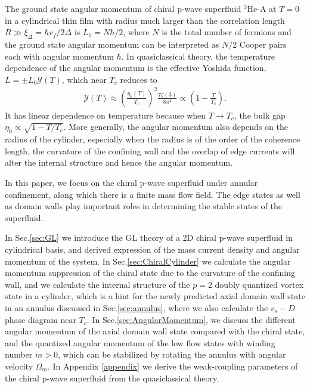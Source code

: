 \documentclass[aps,prb,reprint,groupedaddress]{revtex4-2}
\begin{document}
The ground state angular momentum of chiral p-wave superfluid $^3$He-A at $T=0$
in a cylindrical thin film with radius much larger than the correlation length
$R\gg\xi_\Delta=\hbar v_f/2\Delta$ is $L_0=N\hbar/2$, where $N$ is the total
number of fermions and the ground state angular momentum can be interpreted as
$N/2$ Cooper pairs each with angular momentum $\hbar$\cite{mcclure79}. In
quasiclassical theory, the temperature dependence of the angular momentum is
the effective Yoshida function, $L=\pm L_0\mathcal{Y}(T)$\cite{Sauls11},
which near $T_c$ reduces to
\begin{align}
    \mathcal{Y}(T)\approx\left(\frac{\eta_0(T)}{T_c}\right)^2
    \frac{7\zeta(3)}{8\pi^2}\propto \left(1-\frac{T}{T_c}\right).
\end{align}
It has linear dependence on temperature because when $T\rightarrow T_c$, the bulk gap
$\eta_0\propto\sqrt{1-T/T_c}$. More generally, the angular momentum also depends on
the radius of the cylinder, especially when the
radius is of the order of the coherence length, the curvature of the confining wall
and the overlap of edge currents will alter the internal structure and hence
the angular momentum.

In this paper, we focus on the chiral p-wave superfluid under annular confinement,
along which there is a finite mass flow field. The edge states as well as domain
walls play important roles in determining the stable states of the superfluid.

In Sec.\ref{sec:GL} we introduce the GL theory of a 2D chiral p-wave superfluid
in cylindrical basis, and derived expression of the mass current density and
angular momentum of the system. In Sec.\ref{sec:ChiralCylinder} we calculate the
angular momentum suppression of the chiral state due to the curvature of the
confining wall, and we calculate the internal structure
of the $p=2$ doubly quantized vortex state in a cylinder, which is a hint for
the newly predicted axial domain wall state in an annulus discussed in Sec.\ref{sec:annulus},
where we also calculate the $v_s-D$ phase diagram near $T_c$. In
Sec.\ref{sec:AngularMomentum}, we discuss the different angular momentum of the
axial domain wall state compared with the chiral state, and the quantized angular momentum of the low
flow states with winding number $m>0$, which can be stabilized by rotating the annulus with
angular velocity $\Omega_m$. In Appendix \ref{appendix} we derive the weak-coupling
parameters of the chiral p-wave superfluid from the quasiclassical theory.
\end{document}
